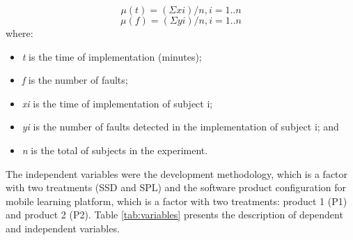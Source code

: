\small

\begin{equation}\label{eq:1}
\mu{(t)}=(\Sigma xi)/n, i = 1..n
\end{equation}
\begin{equation}\label{eq:2}
\mu{(f)}=(\Sigma yi)/n, i = 1..n
\end{equation}
\normalsize 
where:
\begin{itemize}
\item \textit{t} is the time of implementation (minutes);
\item \textit{f} is the number of faults;
\item \textit{xi} is the time of implementation of subject i;
\item \textit{yi} is the number of faults detected in the implementation of subject i; and
\item \textit{n} is the total of subjects in the experiment.
\end{itemize}
\normalsize

The independent variables were the development methodology, which is a factor with two treatments (SSD and SPL) and the software product configuration for mobile learning platform, which is a factor with two treatments: product 1 (P1) and product 2 (P2). Table \ref{tab:variables} presents the description of dependent and independent variables.


